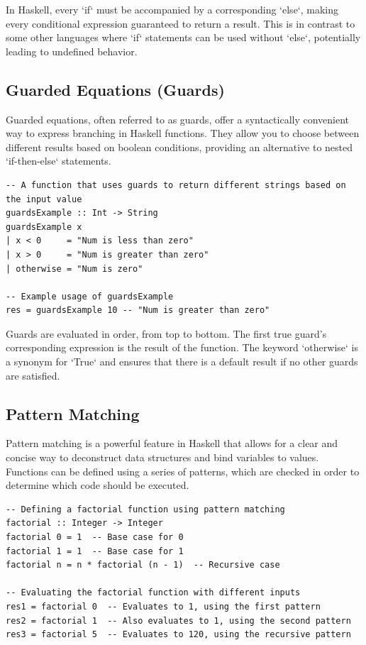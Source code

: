 \documentclass[a4paper, 10pt]{article}
\begin{document}
            \noindent In Haskell, every `if` must be accompanied by a corresponding `else`, making every conditional expression guaranteed to return a result. This is in contrast to some other languages where `if` statements can be used without `else`, potentially leading to undefined behavior.

        \newpage
        \subsection{Guarded Equations (Guards)}
            Guarded equations, often referred to as guards, offer a syntactically convenient way to express branching in Haskell functions. They allow you to choose between different results based on boolean conditions, providing an alternative to nested `if-then-else` statements.

            \lstset{language=Haskell}
            \begin{lstlisting}
-- A function that uses guards to return different strings based on the input value
guardsExample :: Int -> String
guardsExample x
| x < 0     = "Num is less than zero"
| x > 0     = "Num is greater than zero"
| otherwise = "Num is zero"

-- Example usage of guardsExample
res = guardsExample 10 -- "Num is greater than zero"
            \end{lstlisting}

            Guards are evaluated in order, from top to bottom. The first true guard's corresponding expression is the result of the function. The keyword `otherwise` is a synonym for `True` and ensures that there is a default result if no other guards are satisfied.


        \subsection{Pattern Matching}
            Pattern matching is a powerful feature in Haskell that allows for a clear and concise way to deconstruct data structures and bind variables to values. Functions can be defined using a series of patterns, which are checked in order to determine which code should be executed.

            \lstset{language=Haskell}
            \begin{lstlisting}
-- Defining a factorial function using pattern matching
factorial :: Integer -> Integer
factorial 0 = 1  -- Base case for 0
factorial 1 = 1  -- Base case for 1
factorial n = n * factorial (n - 1)  -- Recursive case

-- Evaluating the factorial function with different inputs
res1 = factorial 0  -- Evaluates to 1, using the first pattern
res2 = factorial 1  -- Also evaluates to 1, using the second pattern
res3 = factorial 5  -- Evaluates to 120, using the recursive pattern
            \end{lstlisting}
\end{document}
